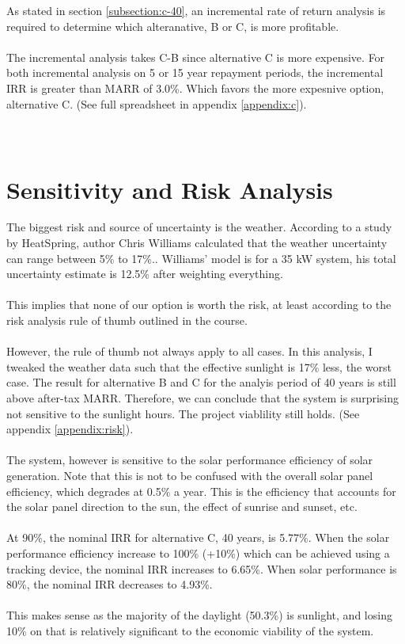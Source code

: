 \documentclass[10pt,letterpaper]{article}
\begin{document}
As stated in section \ref{subsection:c-40}, an incremental rate of return analysis is required to determine which alteranative, B or C, is more profitable.\\
\\
The incremental analysis takes C-B since alternative C is more expensive. For both incremental analysis on 5 or 15 year repayment periods, the incremental IRR is greater than MARR of 3.0\%. Which favors the more expesnive option, alternative C. (See full spreadsheet in appendix \ref{appendix:c}).\\\\
\\

\section{Sensitivity and Risk Analysis}

The biggest risk and source of uncertainty is the weather. According to a study by HeatSpring, author Chris Williams calculated that the weather uncertainty can range between 5\% to 17\%.\cite{solar-production-risk}. Williams' model is for a 35 kW system, his total uncertainty estimate is 12.5\% after weighting everything.\\
\\
This implies that none of our option is worth the risk, at least according to the risk analysis rule of thumb outlined in the course.\\
\\
However, the rule of thumb not always apply to all cases. In this analysis, I tweaked the weather data such that the effective sunlight is 17\% less, the worst case. The result for alternative B and C for the analyis period of 40 years is still above after-tax MARR. Therefore, we can conclude that the system is surprising not sensitive to the sunlight hours. The project viablility still holds. (See appendix \ref{appendix:risk}).\\
\\
The system, however is sensitive to the solar performance efficiency of solar generation. Note that this is not to be confused with the overall solar panel efficiency, which degrades at 0.5\% a year. This is the efficiency that accounts for the solar panel direction to the sun, the effect of sunrise and sunset, etc.\\
\\
At 90\%, the nominal IRR for alternative C, 40 years, is 5.77\%. When the solar performance efficiency increase to 100\% (+10\%) which can be achieved using a tracking device, the nominal IRR increases to 6.65\%. When solar performance is 80\%, the nominal IRR decreases to 4.93\%.\\
\\
This makes sense as the majority of the daylight (50.3\%) is sunlight, and losing 10\% on that is relatively significant to the economic viability of the system.\\
\\
\end{document}
